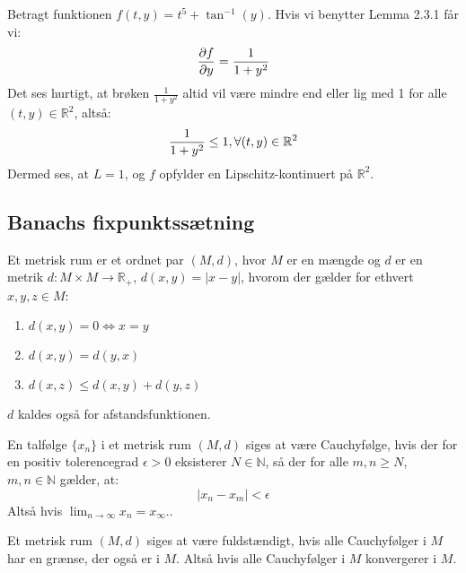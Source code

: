 \begin{Example}\hfill \break
\textnormal{Betragt funktionen $f(t,y)=t^5+\tan^{-1}(y)$. Hvis vi benytter Lemma 2.3.1 får vi:} \hfill \break
\begin{align}
\frac{\partial f}{\partial y}=\frac{1}{1+y^2} \notag
\end{align}
\textnormal{Det ses hurtigt, at brøken $\frac{1}{1+y^2}$ altid vil være mindre end eller lig med 1 for alle $(t,y)\in \mathbb{R}^2$, altså:}
\begin{align}
 \frac{1}{1+y^2}\leq 1, \forall(t,y) \in \mathbb{R}^2 \notag
\end{align}
\textnormal{Dermed ses, at $L=1$, og $f$ opfylder en Lipschitz-kontinuert på $\mathbb{R}^2$.}
\end{Example}

\subsection{Banachs fixpunktssætning}

\begin{definition}
Et metrisk rum er et ordnet par $(M,d)$, hvor $M$ er en mængde og $d$ er en metrik $d:M\times M \rightarrow \mathbb{R}_+$, $d(x,y)=|x-y|$, hvorom der gælder for ethvert $x,y,z \in M$: \hfill \break
\begin{enumerate}
    \item $d(x,y)=0 \Leftrightarrow x=y$ 
    \item $d(x,y)=d(y,x)$
    \item $d(x,z)\leq d(x,y)+d(y,z)$
\end{enumerate}
$d$ kaldes også for afstandsfunktionen.
\end{definition}

\begin{definition}
En talfølge $\{x_n\}$ i et metrisk rum $(M,d)$ siges at være Cauchyfølge, hvis der for en positiv tolerencegrad $\epsilon >0$ eksisterer $N \in \mathbb{N}$, så der for alle $m,n \geq N$, $m,n \in \mathbb{N}$ gælder, at: 
$$|x_n-x_m|<\epsilon$$
Altså hvis $\lim_{n \to \infty} x_n= x_\infty$..
\end{definition}

\begin{definition}
Et metrisk rum $(M,d)$ siges at være fuldstændigt, hvis alle Cauchyfølger i $M$ har en grænse, der også er i $M$. Altså hvis alle Cauchyfølger i $M$ konvergerer i $M$.
\end{definition}

